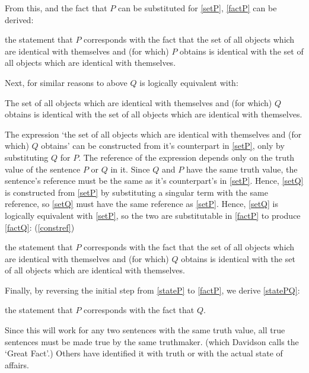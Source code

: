 From this, and the fact that $P$ can be substituted for \ref{setP}, \ref{factP} can be derived:

	\begin{example} \label{factP}
	the statement that $P$ corresponds with the fact that the set of all objects which are identical with themselves and (for which) $P$ obtains is identical with the set of all objects which are identical with themselves.
	\end{example}

Next, for similar reasons to above $Q$ is logically equivalent with:

	\begin{example} \label{setQ}
	The set of all objects which are identical with themselves and (for which) $Q$ obtains is identical with the set of all objects which are identical with themselves.
	\end{example}

The expression `the set of all objects which are identical with themselves and (for which) $Q$ obtains' can be constructed from it's counterpart in \ref{setP}, only by substituting $Q$ for $P$.
The reference of the expression depends only on the truth value of the sentence $P$ or $Q$ in it.
Since $Q$ and $P$ have the same truth value, the sentence's reference must be the same as it's counterpart's in \ref{setP}.
Hence, \ref{setQ} is constructed from \ref{setP} by substituting a singular term with the same reference, so \ref{setQ} must have the same reference as \ref{setP}.
Hence, \ref{setQ} is logically equivalent with \ref{setP}, so the two are substitutable in \ref{factP} to produce \ref{factQ}:
(\ref{constref})


	\begin{example} \label{factQ}
	the statement that $P$ corresponds with the fact that the set of all objects which are identical with themselves and (for which) $Q$ obtains is identical with the set of all objects which are identical with themselves.
	\end{example}

Finally, by reversing the initial step from \ref{stateP} to \ref{factP}, we derive \ref{statePQ}:

	\begin{example} \label{statePQ}
	the statement that $P$ corresponds with the fact that $Q$.
	\end{example}

Since this will work for any two sentences with the same truth value, all true sentences must be made true by the same truthmaker. (which Davidson calls the `Great Fact'.)
\parencite[753]{Davidson_1969}
Others have identified it with truth \parencite[216]{Frege_1948} or with the actual state of affairs. 

